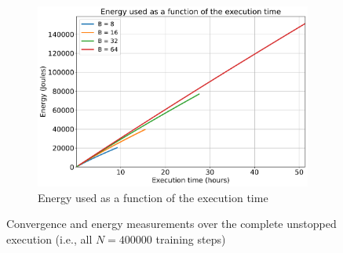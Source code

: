 \documentclass{article}
\begin{document}
{\begin{figure}[!h]
            ~
            \begin{subfigure}[b]{0.47 \textwidth}
                \includegraphics[trim = {0.0in 0.01in 0.0in 0.0in}, clip, width = 1.085 \textwidth]{../Figures/time_vs_energy_validation.pdf}
                \caption{Energy used as a function of the execution time}
                \label{fig:time_vs_energy_validation}
            \end{subfigure}
            \caption{Convergence and energy measurements over the complete unstopped execution (i.e., all $N = 400000$ training steps)}
            \label{fig:unstopped_execution_validation}
        \end{figure}

        \clearpage

}
\end{document}

